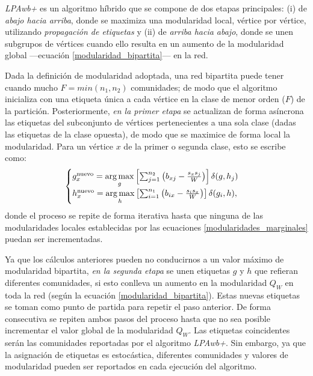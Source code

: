 \documentclass[letterpaper, 11pt]{book}
\theoremstyle{definition}
\theoremstyle{remark}
\begin{document}
\emph{LPAwb+} es un algoritmo híbrido que se compone de dos etapas principales: (i) de \emph{abajo hacia arriba}, donde se maximiza una modularidad local, vértice por vértice, utilizando \emph{propagación de etiquetas} y (ii) de \emph{arriba hacia abajo}, donde se unen subgrupos de vértices cuando ello resulta en un aumento de la modularidad global ---ecuación \ref{modularidad_bipartita}--- en la red. 


Dada la definición de modularidad adoptada, una red bipartita puede tener cuando mucho $F=min(n_{1},n_{2})$ comunidades; de modo que el algoritmo inicializa con una etiqueta única a cada vértice en la clase de menor orden ($F$) de la partición. 
Posteriormente, \emph{en la primer etapa} se actualizan de forma asíncrona las etiquetas del subconjunto de vértices pertenecientes a una sola clase (dadas las etiquetas de la clase opuesta), de modo que se maximice de forma local la modularidad. 
Para un vértice $x$ de la primer o segunda clase, esto se escribe como: 
\begin{equation}\label{modularidades_marginales}
\begin{cases} 
    g_{x}^{\text{nuevo}} = \operatornamewithlimits{arg\,max}\limits_{g} \left[ \sum_{j=1}^{n_{2}} \left( b_{xj} - \frac{s_{x}s_{j}}{W} \right) \right]\delta(g,h_{j})\\
    h_{x}^{\text{nuevo}} = \operatornamewithlimits{arg\,max}\limits_{h} \left[ \sum_{i=1}^{n_{1}} \left( b_{ix} - \frac{s_{i}s_{x}}{W} \right) \right]\delta(g_{i},h), 
\end{cases}
\end{equation} 
donde el proceso se repite de forma iterativa hasta que ninguna de las modularidades locales establecidas por las ecuaciones \ref{modularidades_marginales} puedan ser incrementadas. 


Ya que los cálculos anteriores pueden no conducirnos a un valor máximo de modularidad bipartita, \emph{en la segunda etapa} se unen etiquetas $g$ y $h$ que refieran diferentes comunidades, si esto conlleva un aumento en la modularidad $Q_{W}$ en toda la red (según la ecuación \ref{modularidad_bipartita}). 
Estas nuevas etiquetas se toman como punto de partida para repetir el paso anterior. 
De forma consecutiva se repiten ambos pasos del proceso hasta que no sea posible incrementar el valor global de la modularidad $Q_{W}$. 
Las etiquetas coincidentes serán las comunidades reportadas por el algoritmo \emph{LPAwb+}. 
Sin embargo, ya que la asignación de etiquetas es estocástica, diferentes comunidades y valores de modularidad pueden ser reportados en cada ejecución del algoritmo. 
\end{document}
